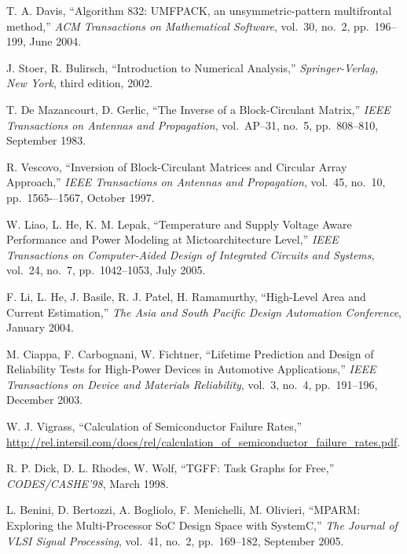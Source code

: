 \begin{thebibliography}{99}
    T. A. Davis,
    ``Algorithm 832: UMFPACK, an unsymmetric-pattern multifrontal method,''
    \emph{ACM Transactions on Mathematical Software},
    vol.~30, no.~2, pp.~196--199, June 2004.

    J. Stoer, R. Bulirsch,
    ``Introduction to Numerical Analysis,''
    \emph{Springer-Verlag, New York},
    third edition, 2002.

    T. De Mazancourt, D. Gerlic,
    ``The Inverse of a Block-Circulant Matrix,''
    \emph{IEEE Transactions on Antennas and Propagation},
    vol.~AP–31, no.~5, pp.~808–810, September 1983.

    R. Vescovo,
    ``Inversion of Block-Circulant Matrices and Circular Array Approach,''
    \emph{IEEE Transactions on Antennas and Propagation},
    vol.~45, no.~10, pp.~1565-–1567, October 1997.

    W. Liao, L. He, K. M. Lepak,
    ``Temperature and Supply Voltage Aware Performance and Power Modeling at Mictoarchitecture Level,''
    \emph{IEEE Transactions on Computer-Aided Design of Integrated Circuits and Systems},
    vol.~24, no.~7, pp.~1042--1053, July 2005.

    F. Li, L. He, J. Basile, R. J. Patel, H. Ramamurthy,
    ``High-Level Area and Current Estimation,''
    \emph{The Asia and South Pacific Design Automation Conference},
    January 2004.

    M. Ciappa, F. Carbognani, W. Fichtner,
    ``Lifetime Prediction and Design of Reliability Tests for High-Power Devices in Automotive Applications,''
    \emph{IEEE Transactions on Device and Materials Reliability},
    vol.~3, no.~4, pp.~191--196, December 2003.

    W. J. Vigrass,
    ``Calculation of Semiconductor Failure Rates,''
    \url{http://rel.intersil.com/docs/rel/calculation_of_semiconductor_failure_rates.pdf}.

    R. P. Dick, D. L. Rhodes, W. Wolf,
    ``TGFF: Task Graphs for Free,''
    \emph{CODES/CASHE'98},
    March 1998.

    L. Benini, D. Bertozzi, A. Bogliolo, F. Menichelli, M. Olivieri,
    ``MPARM: Exploring the Multi-Processor SoC Design Space with SystemC,''
    \emph{The Journal of VLSI Signal Processing},
    vol.~41, no.~2, pp.~169--182, September 2005.


\end{thebibliography}
